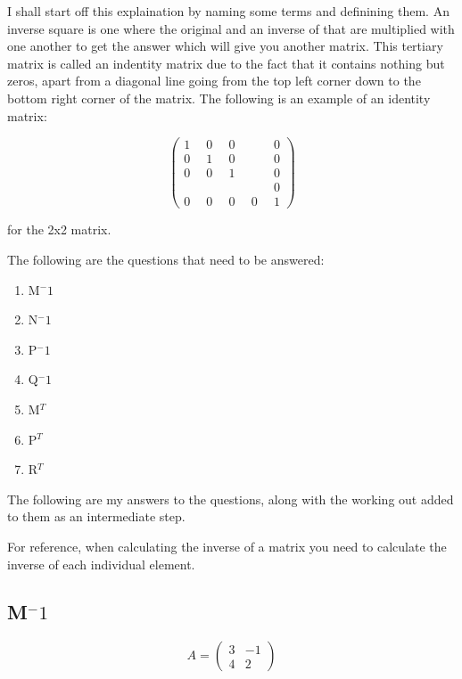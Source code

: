 \documentclass[a4paper,12pt]{article}
\begin{document}
        I shall start off this explaination by naming some terms and definining them. An inverse square is one where the original and an inverse of that are multiplied with one another to get the answer which will give you another matrix. This tertiary matrix is called an indentity matrix due to the fact that it contains nothing but zeros, apart from a diagonal line going from the top left corner down to the bottom right corner of the matrix. The following is an example of an identity matrix:

        \begin{equation}
          \begin{pmatrix}
            1 & 0 & 0 & \quad & 0\\
            0 & 1 & 0 & \quad & 0\\
            0 & 0 & 1 & \quad & 0\\
            \quad & \quad & \quad & \quad & 0\\
            0 & 0 & 0 & 0 & 1
          \end{pmatrix}
        \end{equation}

        for the 2x2 matrix.



        The following are the questions that need to be answered:

        \begin{enumerate}
          \item M$^-1$
          \item N$^-1$
          \item P$^-1$
          \item Q$^-1$
          \item M$^T$
          \item P$^T$
          \item R$^T$
        \end{enumerate}

        The following are my answers to the questions, along with the working out added to them as an intermediate step.

        For reference, when calculating the inverse of a matrix you need to calculate the inverse of each individual element.

        \subsection{M$^-1$}
        \begin{equation}
          A =
          \begin{pmatrix}
            3 & -1\\
            4 &  2
          \end{pmatrix}
        \end{equation}
\end{document}
